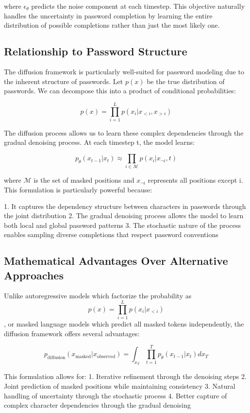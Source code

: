 where $\epsilon_\theta$ predicts the noise component at each timestep. This objective naturally handles the uncertainty in password completion by learning the entire distribution of possible completions rather than just the most likely one.

\subsection{Relationship to Password Structure}
The diffusion framework is particularly well-suited for password modeling due to the inherent structure of passwords. Let $p(x)$ be the true distribution of passwords. We can decompose this into a product of conditional probabilities:

$$p(x) = \prod_{i=1}^L p(x_i|x_{<i}, x_{>i})$$

The diffusion process allows us to learn these complex dependencies through the gradual denoising process. At each timestep t, the model learns:

$$p_\theta(x_{t-1}|x_t) \approx \prod_{i \in \mathcal{M}} p(x_i|x_{\neg i}, t)$$

where $\mathcal{M}$ is the set of masked positions and $x_{\neg i}$ represents all positions except i. This formulation is particularly powerful because:

1. It captures the dependency structure between characters in passwords through the joint distribution
2. The gradual denoising process allows the model to learn both local and global password patterns
3. The stochastic nature of the process enables sampling diverse completions that respect password conventions

\subsection{Mathematical Advantages Over Alternative Approaches}
Unlike autoregressive models which factorize the probability as $$p(x) = \prod_{i=1}^L p(x_i|x_{<i})$$, or masked language models which predict all masked tokens independently, the diffusion framework offers several advantages:

$$p_\text{diffusion}(x_\text{masked}|x_\text{observed}) = \int_{x_T} \prod_{t=1}^T p_\theta(x_{t-1}|x_t)dx_T$$

This formulation allows for:
1. Iterative refinement through the denoising steps
2. Joint prediction of masked positions while maintaining consistency
3. Natural handling of uncertainty through the stochastic process
4. Better capture of complex character dependencies through the gradual denoising

